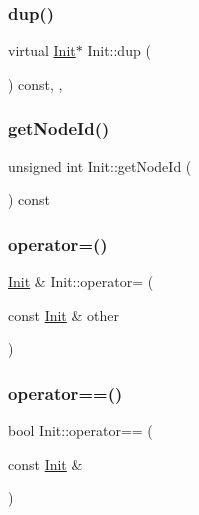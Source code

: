 \subsubsection{\texorpdfstring{dup()}{dup()}}
{\footnotesize\ttfamily virtual \hyperlink{class_init}{Init}$\ast$ Init\+::dup (\begin{DoxyParamCaption}{ }\end{DoxyParamCaption}) const\hspace{0.3cm}{\ttfamily [inline]}, {\ttfamily [override]}, {\ttfamily [virtual]}}

\mbox{\label{class_init_a67fdac2389d7298a742e33a6551e8eb1}} 
\subsubsection{\texorpdfstring{get\+Node\+Id()}{getNodeId()}}
{\footnotesize\ttfamily unsigned int Init\+::get\+Node\+Id (\begin{DoxyParamCaption}{ }\end{DoxyParamCaption}) const\hspace{0.3cm}{\ttfamily [virtual]}}

\mbox{\label{class_init_ab995dd231981ed97018c00b5fd8e9797}} 
\subsubsection{\texorpdfstring{operator=()}{operator=()}}
{\footnotesize\ttfamily \hyperlink{class_init}{Init} \& Init\+::operator= (\begin{DoxyParamCaption}\item[{const \hyperlink{class_init}{Init} \&}]{other }\end{DoxyParamCaption})}

\mbox{\label{class_init_a474b7c9ffdf72a6b2b58558ce68bb03e}} 
\subsubsection{\texorpdfstring{operator==()}{operator==()}}
{\footnotesize\ttfamily bool Init\+::operator== (\begin{DoxyParamCaption}\item[{const \hyperlink{class_init}{Init} \&}]{ }\end{DoxyParamCaption})\hspace{0.3cm}{\ttfamily [protected]}}

